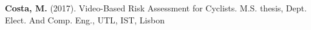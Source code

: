 

\begin{cvpublications}
  \cvpublication
    {\textbf{Costa, M.} (2017). Video-Based Risk Assessment for Cyclists. M.S. thesis, Dept. Elect. And Comp. Eng., UTL, IST, Lisbon}

\end{cvpublications}
